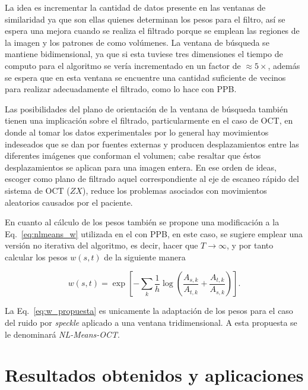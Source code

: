 
La idea es incrementar la cantidad de datos presente en las ventanas de similaridad ya que son ellas quienes determinan los pesos para el filtro, así se espera una mejora cuando se realiza el filtrado porque se emplean las regiones de la imagen y los patrones de \speckle como volúmenes. La ventana de búsqueda se mantiene bidimensional, ya que si esta tuviese tres dimensiones el tiempo de computo para el algoritmo se vería incrementado en un factor de $\approx 5\times$, además se espera que en esta ventana se encuentre una cantidad suficiente de vecinos para realizar adecuadamente el filtrado, como lo hace \nlmeans con PPB. 

Las posibilidades del plano de orientación de la ventana de búsqueda también tienen una implicación sobre el filtrado, particularmente en el caso de OCT, en donde al tomar los datos experimentales por lo general hay movimientos indeseados que se dan por fuentes externas y producen desplazamientos entre las diferentes imágenes que conforman el volumen; cabe resaltar que éstos desplazamientos se aplican para una imagen entera. En ese orden de ideas, escoger como plano de filtrado aquel correspondiente al eje de escaneo rápido del sistema de OCT ($ZX$), reduce los problemas asociados con movimientos aleatorios causados por el paciente.

En cuanto al cálculo de los pesos también se propone una modificación a la Eq.~\ref{eq:nlmeans_w} utilizada en el \nlmeans con PPB, en este caso, se sugiere emplear una versión no iterativa del algoritmo, es decir, hacer que $T \rightarrow \infty$, y por tanto calcular los pesos $w(s,t)$ de la siguiente manera

\begin{equation}
\label{eq:w_propuesta}
w(s,t) = \exp \left[-\sum_{k} \frac{1}{h} \log \left(\frac{A_{s,k}}{A_{t,k}} + \frac{A_{t,k}}{A_{s,k}}\right) \right].
\end{equation}

\noindent La Eq.~\ref{eq:w_propuesta} es unicamente la adaptación de los pesos para el caso del ruido por \textit{speckle} aplicado a una ventana tridimensional. A esta propuesta se le denominará \textit{NL-Means-OCT}.

\section{Resultados obtenidos y aplicaciones}
\label{sec:resultado_filtrado}

